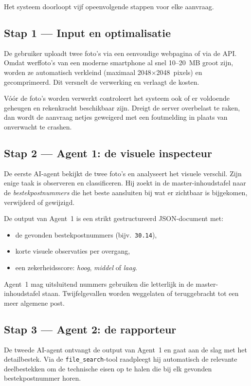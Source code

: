 \documentclass[a4paper,11pt]{article}
\begin{document}
Het systeem doorloopt vijf opeenvolgende stappen voor elke aanvraag.

\subsection{Stap 1 --- Input en optimalisatie}

De gebruiker uploadt twee foto's via een eenvoudige webpagina of via de
API. Omdat werffoto's van een moderne smartphone al snel 10--20~MB groot
zijn, worden ze automatisch verkleind (maximaal 2048$\times$2048~pixels)
en gecomprimeerd. Dit versnelt de verwerking en verlaagt de kosten.

Vóór de foto's worden verwerkt controleert het systeem ook of er
voldoende geheugen en rekenkracht beschikbaar zijn. Dreigt de server
overbelast te raken, dan wordt de aanvraag netjes geweigerd met een
foutmelding in plaats van onverwacht te crashen.

\subsection{Stap 2 --- Agent 1: de visuele inspecteur}

De eerste AI-agent bekijkt de twee foto's en analyseert het visuele
verschil. Zijn enige taak is observeren en classificeren. Hij zoekt in de
master-inhoudstafel naar de \emph{bestekpostnummers} die het beste
aansluiten bij wat er zichtbaar is bijgekomen, verwijderd of gewijzigd.

De output van Agent~1 is een strikt gestructureerd JSON-document met:
\begin{itemize}
    \item de gevonden bestekpostnummers (bijv.\ \texttt{30.14}),
    \item korte visuele observaties per overgang,
    \item een zekerheidsscore: \emph{hoog}, \emph{middel} of \emph{laag}.
\end{itemize}

Agent~1 mag uitsluitend nummers gebruiken die letterlijk in de
master-inhoudstafel staan. Twijfelgevallen worden weggelaten of
teruggebracht tot een meer algemene post.

\subsection{Stap 3 --- Agent 2: de rapporteur}

De tweede AI-agent ontvangt de output van Agent~1 en gaat aan de slag
met het detailbestek. Via de \texttt{file\_search}-tool raadpleegt hij
automatisch de relevante deelbestekken om de technische eisen op te
halen die bij elk gevonden bestekpostnummer horen.
\end{document}
